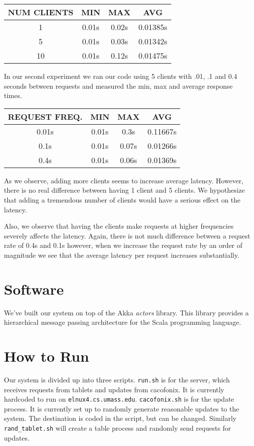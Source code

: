 \documentclass[11pt]{article}
\begin{document}
\begin{tabular}{c|c|c|c}
  NUM CLIENTS & MIN & MAX & AVG \\
  \hline
  1  & 0.01s & 0.02s & 0.01385s \\
  5  & 0.01s & 0.03s & 0.01342s \\
  10 & 0.01s & 0.12s & 0.01475s \\
\end{tabular}

In our second experiment we ran our code using 5 clients with .01, .1
and 0.4 seconds between requests and measured the min, max and
average response times.


\begin{tabular}{c|c|c|c}
  REQUEST FREQ. & MIN & MAX & AVG \\
  \hline
  0.01s & 0.01s & 0.3s  & 0.11667s \\
  0.1s  & 0.01s & 0.07s & 0.01266s \\
  0.4s  & 0.01s & 0.06s & 0.01369s \\
\end{tabular}

As we observe, adding more clients seems to increase average
latency.  However, there is no real difference between having 1 client
and 5 clients.  We hypothesize that adding a tremendous number of
clients would have a serious effect on the latency.

Also, we observe that having the clients make requests at higher
frequencies severely affects the latency.  Again, there is not much
difference between a request rate of 0.4s and 0.1s however, when we
increase the request rate by an order of magnitude we see that the
average latency per request increases substantially.

\section{Software}
We've built our system on top of the Akka \emph{actors} library.  This
library provides a hierarchical message passing architecture for the
Scala programming language.

\section{How to Run}

Our system is divided up into three scripts. \texttt{run.sh} is for the server, which receives requests from tablets and updates from cacofonix. It is currently hardcoded to run on \texttt{elnux4.cs.umass.edu}. \texttt{cacofonix.sh} is for the update process. It is currently set up to randomly generate reasonable updates to the system. The destination is coded in the script, but can be changed. Similarly \texttt{rand_tablet.sh} will create a table process and randomly send requests for updates.
\end{document}
